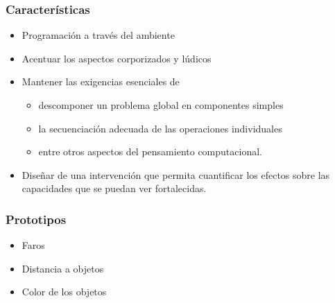\documentclass[spanish]{beamer}
\begin{document}
\begin{frame}
	\frametitle{Características}
	\begin{itemize}
		\item Programación a través del ambiente
		\item Acentuar los aspectos corporizados y lúdicos
		\item Mantener las exigencias esenciales de
		\begin{itemize}
			\item descomponer un problema global en componentes simples
			\item la secuenciación adecuada de las operaciones individuales
			\item entre otros aspectos del pensamiento computacional.
		\end{itemize}
		\item Diseñar de una intervención que permita cuantificar los efectos sobre las capacidades que se puedan ver fortalecidas.
	\end{itemize}
\end{frame}

	
\begin{frame}
	\frametitle{Prototipos}
	\begin{itemize}
		\item Faros
		\item Distancia a objetos
		\item Color de los objetos
	\end{itemize}
\end{frame}
\end{document}
